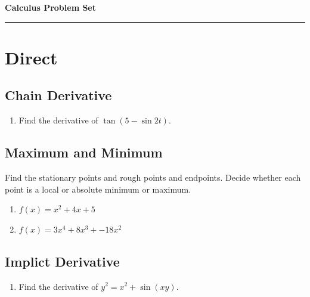 \documentclass[a4paper,12pt]{article}
\begin{document}



\thispagestyle{empty} %

\begin{center} %
{\Large \bf Calculus Problem Set} \\ \vspace{0.3cm}
\end{center} %

\vspace{-0.cm}
\rule{\textwidth}{2pt}
\vspace{-0.5cm}
\section*{\centering Direct}
\subsection*{Chain Derivative}
\begin{enumerate}
\item Find the derivative of $\tan(5-\sin 2t)$.
\end{enumerate}
\subsection*{Maximum and Minimum}
Find the stationary points and rough points and endpoints.
Decide whether each point is a local or absolute minimum or
maximum.
\begin{enumerate}
\item $f(x) = x^2 + 4x + 5$
\item $f(x) = 3x^4 + 8x^3 + -18x^2$
\end{enumerate}
\subsection*{Implict Derivative}
\begin{enumerate}
\item Find the derivative of $y^2 = x^2 + \sin(xy)$.
\end{enumerate}
\end{document}
